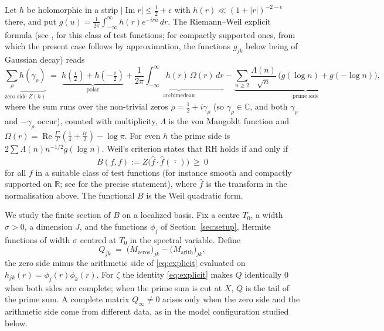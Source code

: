\documentclass[11pt]{amsart}
\theoremstyle{definition}
\theoremstyle{remark}
\newcommand{\re}{\operatorname{Re}}
\newcommand{\im}{\operatorname{Im}}
\begin{document}
Let $h$ be holomorphic in a strip $|\im r|\le\tfrac12+\epsilon$ with
$h(r)\ll(1+|r|)^{-2-\epsilon}$ there, and put
$g(u)=\frac1{2\pi}\int_{-\infty}^{\infty}h(r)e^{-iru}\,dr$. The
Riemann--Weil explicit formula (see \cite{Weil1952}, \cite{bgBombieriWeil} for this class of test functions; \cite[Thm.~5.12]{IK} for compactly supported ones, from which the present case follows by approximation, the functions $g_{jk}$ below being of Gaussian decay) reads
\begin{equation}\label{eq:explicit}
  \underbrace{\sum_{\rho} h(\gamma_\rho)}_{\text{zero side }Z(h)}
  \;=\;
  \underbrace{h(\tfrac i2)+h(-\tfrac i2)}_{\text{polar}}
  +\underbrace{\frac1{2\pi}\!\int_{-\infty}^{\infty}\! h(r)\,\Omega(r)\,dr}_{\text{archimedean}}
  -\underbrace{\sum_{n\ge2}\frac{\Lambda(n)}{\sqrt n}\,\bigl(g(\log n)+g(-\log n)\bigr)}_{\text{prime side}},
\end{equation}
where the sum runs over the non-trivial zeros $\rho=\tfrac12+i\gamma_\rho$
(so $\gamma_\rho\in\mathbb C$, and both $\gamma_\rho$ and $-\gamma_\rho$
occur), counted with multiplicity, $\Lambda$ is the von Mangoldt function and
$\Omega(r)=\re\frac{\Gamma'}{\Gamma}(\tfrac14+\tfrac{ir}{2})-\log\pi$. For
even $h$ the prime side is $2\sum\Lambda(n)n^{-1/2}g(\log n)$. Weil's
criterion \cite{Weil1952,bgBombieriWeil} states that RH holds if and only if
\begin{equation}\label{eq:weil-criterion}
  B(f,f):=Z\bigl(\hat f\cdot\overline{\hat f(\bar{\,\cdot\,})}\bigr)\ \ge\ 0
\end{equation}
for all $f$ in a suitable class of test functions (for instance smooth and
compactly supported on $\mathbb R$; see \cite{bgBombieriWeil} for the precise
statement), where $\hat f$ is the transform in the normalisation above. The
functional $B$ is the Weil quadratic form.

We study the finite section of $B$ on a localized basis. Fix a centre $T_0$,
a width $\sigma>0$, a dimension $J$, and the functions $\phi_j$ of
Section~\ref{sec:setup}, Hermite functions of width $\sigma$ centred at $T_0$
in the spectral variable. Define
\begin{equation}\label{eq:Q}
  Q_{jk} \;=\; \bigl(M_{\mathrm{zeros}}\bigr)_{jk}-\bigl(M_{\mathrm{arith}}\bigr)_{jk},
\end{equation}
the zero side minus the arithmetic side of \eqref{eq:explicit} evaluated on
$h_{jk}(r)=\phi_j(r)\phi_k(r)$. For $\zeta$ the identity \eqref{eq:explicit}
makes $Q$ identically $0$ when both sides are complete; when the prime sum is
cut at $X$, $Q$ is the tail of the prime sum. A complete matrix
$Q_\infty\ne0$ arises only when the zero side and the arithmetic side come
from different data, as in the model configuration
studied below.
\end{document}
